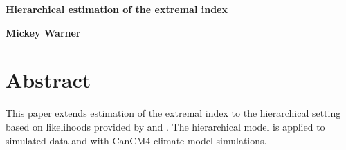 \begin{Large}
\noindent \textbf{Hierarchical estimation of the extremal index}
\end{Large}
\bigskip

\noindent \textbf{Mickey Warner}

\section{Abstract}
\label{abstract}

This paper extends estimation of the extremal index to the hierarchical setting based on likelihoods provided by \cite{ferro2003inference} and \cite{suveges2010model}.            The hierarchical model is applied to simulated data and with CanCM4 climate model simulations.
